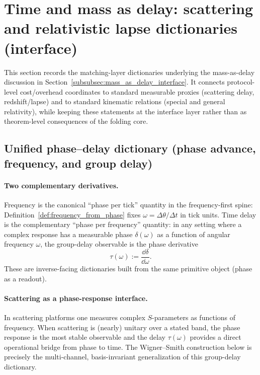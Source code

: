 
\section{Time and mass as delay: scattering and relativistic lapse dictionaries (interface)}
\label{app:time_mass_delay}

This section records the matching-layer dictionaries underlying the mass-as-delay discussion in Section~\ref{subsubsec:mass_as_delay_interface}.
It connects protocol-level cost/overhead coordinates to standard measurable proxies (scattering delay, redshift/lapse) and to standard kinematic relations (special and general relativity), while keeping these statements at the interface layer rather than as theorem-level consequences of the folding core.

\subsection{Unified phase--delay dictionary (phase advance, frequency, and group delay)}
\label{subsec:unified_phase_delay_dictionary}

\paragraph{Two complementary derivatives.}
\InterfaceTag Frequency is the canonical ``phase per tick'' quantity in the frequency-first spine:
Definition~\ref{def:frequency_from_phase} fixes $\omega=\Delta\theta/\Delta t$ in tick units.
Time delay is the complementary ``phase per frequency'' quantity: in any setting where a complex response has a measurable phase $\delta(\omega)$ as a function of angular frequency $\omega$, the group-delay observable is the phase derivative
\[
\tau(\omega):=\frac{\dd \delta}{\dd \omega}.
\]
These are inverse-facing dictionaries built from the same primitive object (phase as a readout).

\paragraph{Scattering as a phase-response interface.}
\InterfaceTag In scattering platforms one measures complex $S$-parameters as functions of frequency.
When scattering is (nearly) unitary over a stated band, the phase response is the most stable observable and the delay $\tau(\omega)$ provides a direct operational bridge from phase to time.
The Wigner--Smith construction below is precisely the multi-channel, basis-invariant generalization of this group-delay dictionary.

